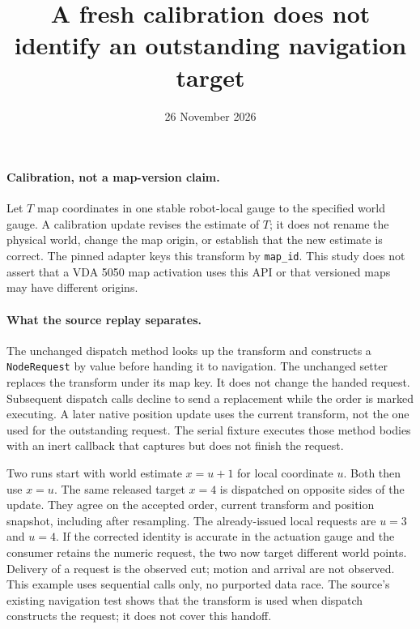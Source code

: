\documentclass[11pt]{article}
\title{A fresh calibration does not identify an outstanding navigation target}
\date{26 November 2026}
\begin{document}
\maketitle
\paragraph{Calibration, not a map-version claim.}
Let $T$ map coordinates in one stable robot-local gauge to the specified
world gauge. A calibration update revises the estimate of $T$; it does not
rename the physical world, change the map origin, or establish that the
new estimate is correct. The pinned adapter keys this transform by
\texttt{map\_id}. This study does not assert that a VDA 5050 map activation
uses this API or that versioned maps may have different origins.

\paragraph{What the source replay separates.}
The unchanged dispatch method looks up the transform and constructs a
\texttt{NodeRequest} by value before handing it to navigation. The
unchanged setter replaces the transform under its map key. It does not
change the handed request. Subsequent dispatch calls decline to send a
replacement while the order is marked executing. A later native
position update uses the current transform, not the one used for the
outstanding request. The serial fixture executes those method bodies
with an inert callback that captures but does not finish the request.

Two runs start with world estimate $x=u+1$ for local coordinate $u$.
Both then use $x=u$. The same released target $x=4$ is dispatched on
opposite sides of the update. They agree on the accepted order, current
transform and position snapshot, including after resampling. The
already-issued local requests are $u=3$ and $u=4$. If the corrected
identity is accurate in the actuation gauge and the consumer retains the
numeric request, the two now target different world points. Delivery of a
request is the observed cut; motion and arrival are not observed.
This example uses sequential calls only, no purported data race.
The source's existing navigation test shows that the transform is used
when dispatch constructs the request; it does not cover this handoff.
\end{document}
